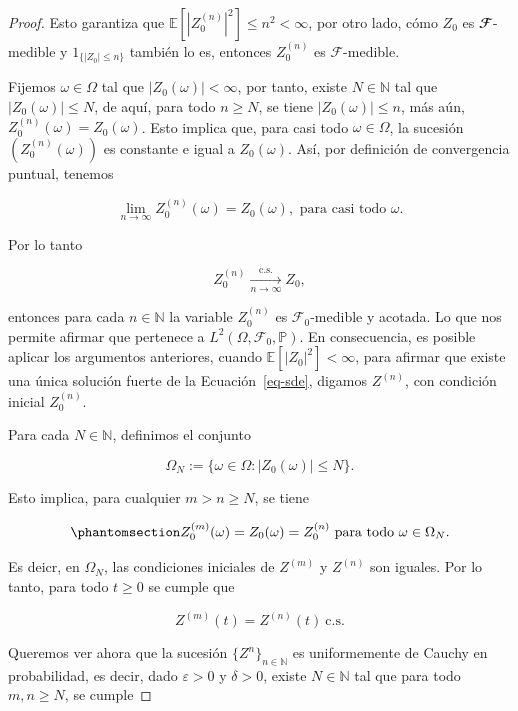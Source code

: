 \documentclass[
  spanish,
  us-letterpaper,
]{scrreprt}
\theoremstyle{plain}
\theoremstyle{plain}
\theoremstyle{plain}
\theoremstyle{definition}
\theoremstyle{remark}
\begin{document}
\begin{proof}
Esto garantiza que \(\mathbb{E}[|Z_0^{(n)}|^2]\leq n^2<\infty\), por
otro lado, cómo \(Z_0\) es \(\mathbfcal{F}\)- medible y
\(1_{\{|Z_0|\leq n\}}\) también lo es, entonces \(Z_0^{(n)}\) es
\(\mathcal{F}\)-medible.

Fijemos \(\omega\in \Omega\) tal que \(|Z_0(\omega)|<\infty\), por
tanto, existe \(N\in \mathbb{N}\) tal que \(|Z_0(\omega)|\leq N\), de
aquí, para todo \(n\geq N\), se tiene \(|Z_0(\omega)|\leq n\), más aún,
\(\displaystyle Z_0^{(n)}(\omega)=Z_0(\omega)\). Esto implica que, para
casi todo \(\omega\in\Omega\), la sucesión \((Z_0^{(n)}(\omega))\) es
constante e igual a \(Z_0(\omega)\). Así, por definición de convergencia
puntual, tenemos

\[
\lim\limits_{n\rightarrow\infty}Z_0^{(n)}(\omega)=Z_0(\omega), \text{ para casi todo $\omega$}.
\]

Por lo tanto

\[
Z_0^{(n)} \xrightarrow[n \to \infty]{\text{c.s.}} Z_0,
\]

entonces para cada \(n\in \mathbb{N}\) la variable \(Z_0^{(n)}\) es
\(\mathcal{F}_0\)-medible y acotada. Lo que nos permite afirmar que
pertenece a \(L^2(\Omega,\mathcal{F}_0,\mathbb{P})\). En consecuencia,
es posible aplicar los argumentos anteriores, cuando
\(\mathbb{E}[|Z_0|^2]<\infty\), para afirmar que existe una única
solución fuerte de la Ecuación~\ref{eq-sde}, digamos \(Z^{(n)}\), con
condición inicial \(Z_0^{(n)}\).

Para cada \(N\in \mathbb{N}\), definimos el conjunto

\[
    \Omega_N:=\{\omega\in \Omega:|Z_0(\omega)|\leq N\}.
\]

Esto implica, para cualquier \(m>n\geq N\), se tiene

\begin{equation}\phantomsection\label{eq-20}{
    Z_0^{(m)}(\omega)=Z_0(\omega)=Z_0^{(n)} \text{   para todo $\omega\in \Omega_N$}.
}\end{equation}

Es deicr, en \(\Omega_N\), las condiciones iniciales de \(Z^{(m)}\) y
\(Z^{(n)}\) son iguales. Por lo tanto, para todo \(t\geq 0\) se cumple
que

\[
    Z^{(m)}(t)=Z^{(n)}(t)\ \text{c.s.}
\]

Queremos ver ahora que la sucesión \(\{Z^{n}\}_{n\in \mathbb{N}}\) es
uniformemente de Cauchy en probabilidad, es decir, dado
\(\varepsilon>0\) y \(\delta>0\), existe \(N\in \mathbb{N}\) tal que
para todo \(m,n\geq N\), se cumple


\end{proof}
\end{document}
